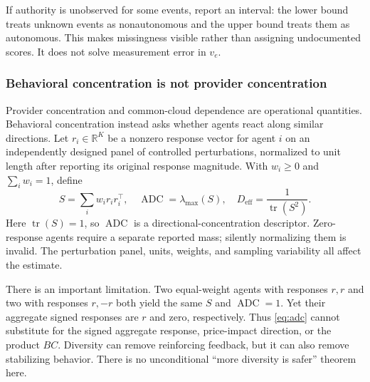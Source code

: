 \documentclass[10pt,twocolumn,letterpaper]{article}
\theoremstyle{definition}
\theoremstyle{remark}
\newcommand{\R}{\mathbb{R}}
\newcommand{\tr}{\operatorname{tr}}
\newcommand{\ADC}{\operatorname{ADC}}
\begin{document}
If authority is unobserved for some events, report an interval: the lower bound treats unknown events as nonautonomous and the upper bound treats them as autonomous. This makes missingness visible rather than assigning undocumented scores. It does not solve measurement error in $v_e$.

\subsubsection{Behavioral concentration is not provider concentration}
Provider concentration and common-cloud dependence are operational quantities. Behavioral concentration instead asks whether agents react along similar directions. Let $r_i\in\R^K$ be a nonzero response vector for agent $i$ on an independently designed panel of controlled perturbations, normalized to unit length after reporting its original response magnitude. With $w_i\geq0$ and $\sum_iw_i=1$, define
\begin{equation}
 S=\sum_i w_i r_i r_i^\top,\quad
 \ADC=\lambda_{\max}(S),\quad
 D_{\mathrm{eff}}=\frac{1}{\tr(S^2)}.
 \label{eq:adc}
\end{equation}
Here $\tr(S)=1$, so $\ADC$ is a directional-concentration descriptor. Zero-response agents require a separate reported mass; silently normalizing them is invalid. The perturbation panel, units, weights, and sampling variability all affect the estimate.

There is an important limitation. Two equal-weight agents with responses $r,r$ and two with responses $r,-r$ both yield the same $S$ and $\ADC=1$. Yet their aggregate signed responses are $r$ and zero, respectively. Thus \cref{eq:adc} cannot substitute for the signed aggregate response, price-impact direction, or the product $BC$. Diversity can remove reinforcing feedback, but it can also remove stabilizing behavior. There is no unconditional ``more diversity is safer'' theorem here.
\end{document}
